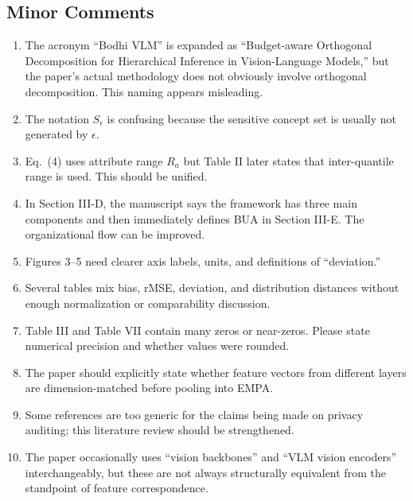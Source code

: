 \subsection*{Minor Comments}
\begin{enumerate}
    \item The acronym ``Bodhi VLM'' is expanded as ``Budget-aware Orthogonal Decomposition for Hierarchical Inference in Vision-Language Models,'' but the paper's actual methodology does not obviously involve orthogonal decomposition. This naming appears misleading.
    \item The notation $S_{\epsilon}$ is confusing because the sensitive concept set is usually not generated by $\epsilon$.
    \item Eq.~(4) uses attribute range $R_a$ but Table II later states that inter-quantile range is used. This should be unified.
    \item In Section III-D, the manuscript says the framework has three main components and then immediately defines BUA in Section III-E. The organizational flow can be improved.
    \item Figures 3--5 need clearer axis labels, units, and definitions of ``deviation.''
    \item Several tables mix bias, rMSE, deviation, and distribution distances without enough normalization or comparability discussion.
    \item Table III and Table VII contain many zeros or near-zeros. Please state numerical precision and whether values were rounded.
    \item The paper should explicitly state whether feature vectors from different layers are dimension-matched before pooling into EMPA.
    \item Some references are too generic for the claims being made on privacy auditing; this literature review should be strengthened.
    \item The paper occasionally uses ``vision backbones'' and ``VLM vision encoders'' interchangeably, but these are not always structurally equivalent from the standpoint of feature correspondence.
\end{enumerate}

